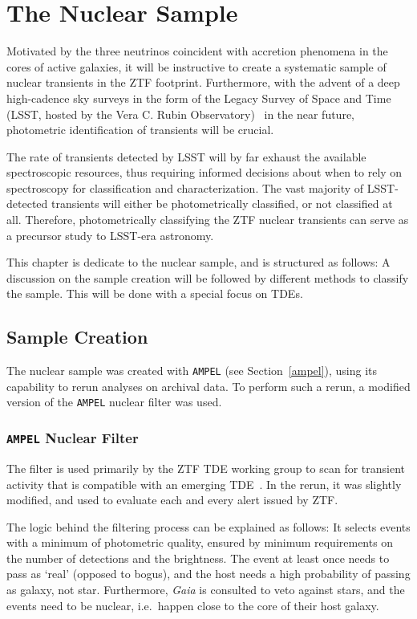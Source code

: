 \chapter{The Nuclear Sample}\label{ztf}
Motivated by the three neutrinos coincident with accretion phenomena in the cores of active galaxies, it will be instructive to create a systematic sample of nuclear transients in the ZTF footprint. Furthermore, with the advent of a deep high-cadence sky surveys in the form of the Legacy Survey of Space and Time (LSST, hosted by the Vera C. Rubin Observatory)~ in the near future, photometric identification of transients will be crucial.

The rate of transients detected by LSST will by far exhaust the available spectroscopic resources, thus requiring informed decisions about when to rely on spectroscopy for classification and characterization. The vast majority of LSST-detected transients will either be photometrically classified, or not classified at all. Therefore, photometrically classifying the ZTF nuclear transients can serve as a precursor study to LSST-era astronomy.

This chapter is dedicate to the nuclear sample, and is structured as follows: A discussion on the sample creation will be followed by different methods to classify the sample. This will be done with a special focus on TDEs.

\section{Sample Creation}
The nuclear sample was created with \texttt{AMPEL} (see Section~\ref{ampel}), using its capability to rerun analyses on archival data. To perform such a rerun, a modified version of the \texttt{AMPEL} nuclear filter was used.

\subsection{\texttt{AMPEL} Nuclear Filter}

The filter is used primarily by the ZTF TDE working group to scan for transient activity that is compatible with an emerging TDE~\cite{Velzen2021a}. In the rerun, it was slightly modified, and used to evaluate each and every alert issued by ZTF.

The logic behind the filtering process can be explained as follows: It selects events with a minimum of photometric quality, ensured by minimum requirements on the number of detections and the brightness. The event at least once needs to pass as `real' (opposed to bogus), and the host needs a high probability of passing as galaxy, not star. Furthermore, \textit{Gaia} is consulted to veto against stars, and the events need to be nuclear, i.e.~happen close to the core of their host galaxy.

